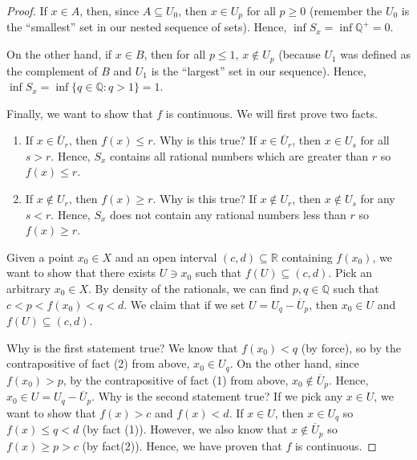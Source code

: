 \documentclass{article}
\newcommand{\nline}{\vspace*{0.5\baselineskip}}
\theoremstyle{definition}
\begin{document}
\begin{flushleft}
\begin{proof}
\nline

If $x \in A$, then, since $A \subseteq U_0$, then $x \in U_p$ for all $p \geq 0$ (remember the $U_0$ is the ``smallest'' set in our nested sequence of sets). Hence, $\inf S_x = \inf \mathbb{Q}^+ = 0$.

\nline

On the other hand, if $x \in B$, then for all $p \leq 1$, $x \notin U_p$ (because $U_1$ was defined as the complement of $B$ and $U_1$ is the ``largest'' set in our sequence). Hence, $\inf S_x = \inf \{ q \in \mathbb{Q} : q > 1\} = 1$.

\nline

Finally, we want to show that $f$ is continuous. We will first prove two facts.

\begin{enumerate}
    \item If $x \in \overline{U}_r$, then $f(x) \leq r$. Why is this true? If $x \in \overline{U}_r$, then $x \in U_s$ for all $s > r$. Hence, $S_x$ contains all rational numbers which are greater than $r$ so $f(x) \leq r$.
    \item If $x \notin U_r$, then $f(x) \geq r$. Why is this true? If $x \notin U_r$, then $x \notin U_s$ for any $s < r$. Hence, $S_x$ does not contain any rational numbers less than $r$ so $f(x) \geq r$.
\end{enumerate}

Given a point $x_0 \in X$ and an open interval $(c,d) \subseteq \mathbb{R}$ containing $f(x_0)$, we want to show that there exists $U \ni x_0$ such that $f(U) \subseteq (c,d)$. %
Pick an arbitrary $x_0 \in X$. By density of the rationals, we can find $p, q \in \mathbb{Q}$ such that $c < p < f(x_0) < q < d$. We claim that if we set $U = U_q - \overline{U}_p$, then $x_0 \in U$ and $f(U) \subseteq (c,d)$.

\nline

Why is the first statement true? We know that $f(x_0) < q$ (by force), so by the contrapositive of fact (2) from above, $x_0 \in U_q$. On the other hand, since $f(x_0) > p$, by the contrapositive of fact (1) from above, $x_0 \notin \overline{U}_p$. Hence, $x_0 \in U = U_q - \overline{U}_p$. Why is the second statement true? If we pick any $x \in U$, we want to show that $f(x) > c$ and $f(x) < d$. If $x \in U$, then $x \in U_q$ so $f(x) \leq q < d$ (by fact (1)). However, we also know that $x \notin \overline{U}_p$ so $f(x) \geq p > c$ (by fact(2)). Hence, we have proven that $f$ is continuous.
\end{proof}


\end{flushleft}
\end{document}
